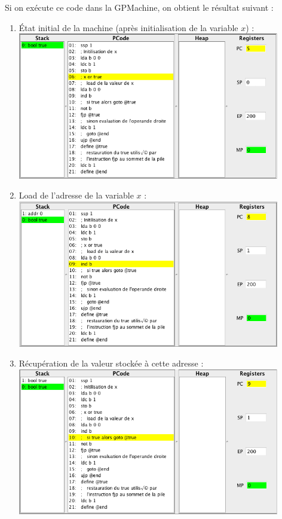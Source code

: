 \documentclass[french,11pt,twoside]{article}
\begin{document}
Si on exécute ce code dans la GPMachine, on obtient le résultat suivant :
\begin{enumerate}
\item \'{E}tat initial de la machine (après initialisation de la variable $x$) : \\
            \includegraphics[width=0.9\textwidth]{images/exemple2-step0}
\item Load de l'adresse de la variable $x$ : \\
            \includegraphics[width=0.9\textwidth]{images/exemple2-step1}
\item Récupération de la valeur stockée à cette adresse : \\
            \includegraphics[width=0.9\textwidth]{images/exemple2-step2} 

\end{enumerate}
\end{document}
